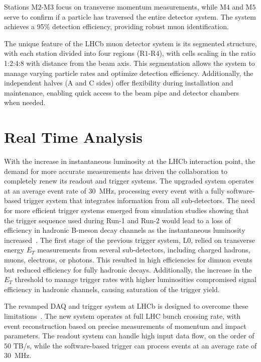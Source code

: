 Stations M$2$-M$3$ focus on transverse momentum measurements, while M$4$ and M$5$ serve to confirm if a particle has traversed the entire detector system. The system achieves a 95\% detection efficiency, providing robust muon identification. 

The unique feature of the LHCb muon detector system is its segmented structure, with each station divided into four regions (R$1$-R$4$), with cells scaling in the ratio 1:2:4:8 with distance from the beam axis. This segmentation allows the system to manage varying particle rates and optimize detection efficiency. Additionally, the independent halves (A and C sides) offer flexibility during installation and maintenance, enabling quick access to the beam pipe and detector chambers when needed.


\section{Real Time Analysis}\label{sec:rta}

With the increase in instantaneous luminosity at the LHCb interaction point, the demand for more accurate measurements has driven the collaboration to completely renew its readout and trigger systems. The upgraded system operates at an average event rate of \SI{30}{\mega\hertz}, processing every event with a fully software-based trigger system that integrates information from all sub-detectors. The need for more efficient trigger systems emerged from simulation studies showing that the trigger sequence used during Run-1 and Run-2 would lead to a loss of efficiency in hadronic B-meson decay channels as the instantaneous luminosity increased~\cite{CERN-LHCC-2011-001}. The first stage of the previous trigger system, L$0$, relied on transverse energy $E_T$ measurements from several sub-detectors, including charged hadrons, muons, electrons, or photons. This resulted in high efficiencies for dimuon events but reduced efficiency for fully hadronic decays. Additionally, the increase in the $E_T$ threshold to manage trigger rates with higher luminosities compromised signal efficiency in hadronic channels, causing saturation of the trigger yield.

The revamped DAQ and trigger system at LHCb is designed to overcome these limitations~\cite{CERN-LHCC-2018-014}. The new system operates at full LHC bunch crossing rate, with event reconstruction based on precise measurements of momentum and impact parameters. The readout system can handle high input data flow, on the order of $50$ TB/s, while the software-based trigger can process events at an average rate of \SI{30}{\mega\hertz}. 


